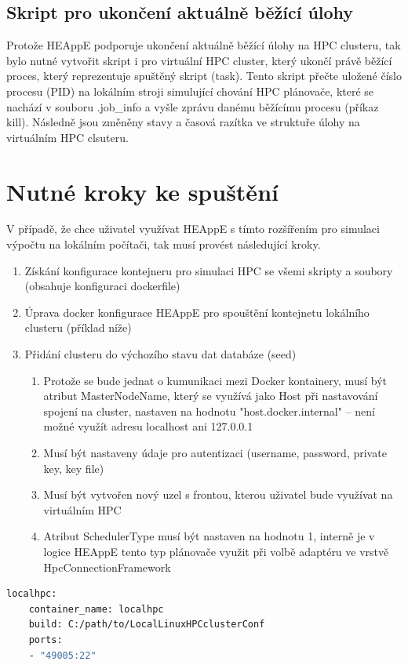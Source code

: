 \subsection{Skript pro ukončení aktuálně běžící úlohy}
Protože HEAppE podporuje ukončení aktuálně běžící úlohy na HPC clusteru, tak bylo nutné vytvořit skript i pro virtuální HPC cluster, který ukončí právě běžící proces, který reprezentuje spuštěný skript (task). Tento skript přečte uložené číslo procesu (PID) na lokálním stroji simulující chování HPC plánovače, které se nachází v souboru .job\_info a vyšle zprávu danému běžícímu procesu (příkaz kill). Následně jsou změněny stavy a časová razítka ve struktuře úlohy na virtuálním HPC clsuteru.

\section{Nutné kroky ke spuštění}
V případě, že chce uživatel využívat HEAppE s tímto rozšířením pro simulaci výpočtu na lokálním počítači, tak musí provést následující kroky.

\begin{enumerate}
	\item Získání konfigurace kontejneru pro simulaci HPC se všemi skripty a soubory (obsahuje konfiguraci dockerfile)
	\item Úprava docker konfigurace HEAppE pro spouštění kontejnetu lokálního clusteru (příklad níže)
	\item Přidání clusteru do výchozího stavu dat databáze (seed)
	\begin{enumerate}
	    \item Protože se bude jednat o kumunikaci mezi Docker kontainery, musí být atribut MasterNodeName, který se využívá jako Host při nastavování spojení na cluster, nastaven na hodnotu "host.docker.internal" – není možné využít adresu localhost ani 127.0.0.1
	    \item Musí být nastaveny údaje pro autentizaci (username, password, private key, key file)
	    \item Musí být vytvořen nový uzel s frontou, kterou uživatel bude využívat na virtuálním HPC
	    \item Atribut SchedulerType musí být nastaven na hodnotu 1, interně je v logice HEAppE tento typ plánovače využit při volbě adaptéru ve vrstvě HpcConnectionFramework
	\end{enumerate}
\end{enumerate}

\begin{lstlisting}[language=Dockerfile,caption={Docker konfigurace pro spouštění kontejnetu lokálního clusteru}]
localhpc:
    container_name: localhpc
    build: C:/path/to/LocalLinuxHPCclusterConf
    ports:
    - "49005:22"
\end{lstlisting}


